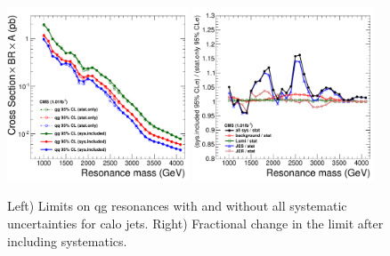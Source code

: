 \begin{figure}[!ht]
  \begin{center}
     \includegraphics[width=0.48\textwidth]{Figures/c_xs_all_calo.pdf}
    \includegraphics[width=0.48\textwidth]{Figures/c_xs_comparison_bw_stat_sys_calo.pdf}
    \caption{Left) Limits on qg resonances with and without all systematic uncertainties for calo jets. 
    Right) Fractional change in the limit after including systematics.}
    \label{limit_change_calo}
  \end{center}
\end{figure}

\clearpage

